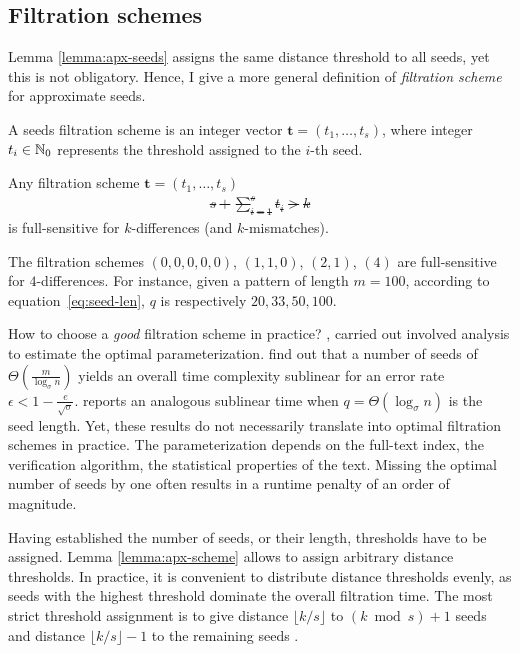\subsection{Filtration schemes}

Lemma \ref{lemma:apx-seeds} assigns the same distance threshold to all seeds, yet this is not obligatory.
Hence, I give a more general definition of \emph{filtration scheme} for approximate seeds.
\begin{definition}
A seeds filtration scheme is an integer vector $\mathbf{t} = (t_1, \dots, t_s)$, where integer $t_i \in \mathbb {N}_0$ represents the threshold assigned to the $i$-th seed.
\end{definition}

\begin{lemma}
\label{lemma:apx-scheme}
Any filtration scheme $\mathbf{t} = (t_1, \dots, t_s)$ \st
\begin{eqnarray}
s + \sum_{i=1}^s t_i > k
\end{eqnarray}
is full-sensitive for $k$-differences (and $k$-mismatches).
\end{lemma}

\begin{example}
\label{ex:seeds-apx-scheme}
The filtration schemes $(0,0,0,0,0)$, $(1,1,0)$, $(2,1)$, $(4)$ are full-sensitive for $4$-differences.
For instance, given a pattern of length $m=100$, according to equation~\ref{eq:seed-len}, $q$ is respectively $20, 33, 50, 100$.
\end{example}

How to choose a \emph{good} filtration scheme in practice?
\cite{Myers1994}, \cite{Navarro2000} carried out involved analysis to estimate the optimal parameterization. \citeauthor{Navarro2000} find out that a number of seeds of $\Theta(\frac{m}{\log_{\sigma}{n}})$ yields an overall time complexity sublinear for an error rate $\epsilon < 1 - \frac{e}{\sqrt{\sigma}}$.
\citeauthor{Myers1994} reports an analogous sublinear time when $q=\Theta(\log_{\sigma}{n})$ is the seed length.
Yet, these results do not necessarily translate into optimal filtration schemes in practice.
The parameterization depends on the full-text index, the verification algorithm, the statistical properties of the text.
Missing the optimal number of seeds by one often results in a runtime penalty of an order of magnitude.

Having established the number of seeds, or their length, thresholds have to be assigned.
Lemma \ref{lemma:apx-scheme} allows to assign arbitrary distance thresholds.
In practice, it is convenient to distribute distance thresholds evenly, as seeds with the highest threshold dominate the overall filtration time.
The most strict threshold assignment is to give distance $\lfloor k/s \rfloor$ to $(k \bmod{s}) + 1$ seeds and distance $\lfloor k/s \rfloor - 1$ to the remaining seeds \citep{Siragusa2013}.

